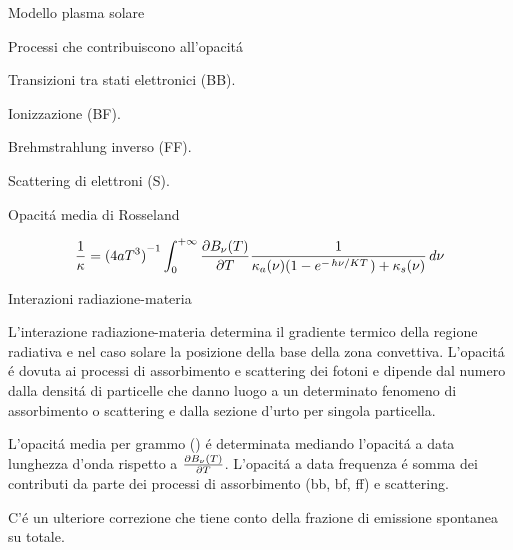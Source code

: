 \documentclass[10pt,xcolor={usenames},fleqn,mathserif,serif]{beamer}
\begin{document}
\begin{frame}{Modello plasma solare}

\begin{block}{Processi che contribuiscono all'opacit\'a}

Transizioni tra stati elettronici (BB).

Ionizzazione (BF).

Brehmstrahlung inverso (FF).

Scattering di elettroni (S).

\end{block}

\vfill

\begin{block}{Opacit\'a media di Rosseland}

\vfill

\begin{equation*}
\frac{1}{\kappa}=\invers{(4aT^3)}\int_0^{+\infty}\PDy{T}{B_{\nu}(T)}\frac{1}{\kappa_{a}(\nu)(1-\exp{-\midfrac{h\nu}{KT}})+\kappa_s(\nu)}\,d\nu
\end{equation*}

\end{block}

\vfill

\end{frame}

\begin{wordonframe}{Interazioni radiazione-materia}

L'interazione radiazione-materia determina il gradiente termico della regione radiativa e nel caso solare la posizione della base della zona convettiva. L'opacit\'a \'e dovuta ai processi di assorbimento e scattering dei fotoni e dipende dal numero dalla densit\'a di particelle che danno luogo a un determinato fenomeno di assorbimento o scattering e dalla sezione d'urto per singola particella.

L'opacit\'a media per grammo () \'e determinata mediando l'opacit\'a a data lunghezza d'onda rispetto a $\PDy{T}{B_{\nu}(T)}$. L'opacit\'a a data frequenza \'e somma dei contributi da parte dei processi di assorbimento (bb, bf, ff) e scattering.

C'\'e un ulteriore correzione che tiene conto della frazione di emissione spontanea su totale.

\end{wordonframe}
\end{document}
